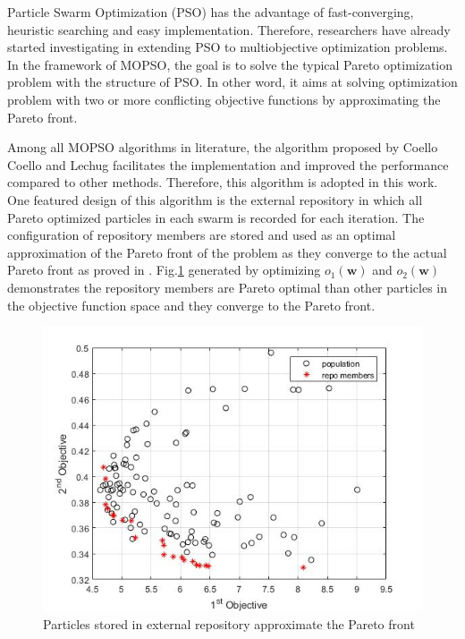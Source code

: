 Particle Swarm Optimization (PSO) has the advantage of fast-converging, heuristic searching and easy implementation\cite{coello2002mopso, alvarez2005mopso}. Therefore, researchers have already started investigating in extending PSO to multiobjective optimization problems. In the framework of MOPSO, the goal is to solve the typical Pareto optimization problem with the structure of PSO. In other word, it aims at solving optimization problem with two or more conflicting objective functions by approximating the Pareto front. 


Among all MOPSO algorithms in literature, the algorithm proposed by Coello Coello and Lechug facilitates the implementation and improved the performance compared to other methods\cite{coello2002mopso}. Therefore,  this algorithm is adopted in this work. One featured design of this algorithm is the external repository in which all Pareto optimized particles in each swarm is recorded for each iteration. The configuration of repository members are stored and used as an optimal approximation of the Pareto front of the problem as they converge to the actual Pareto front as proved in \cite{coello2002mopso}. Fig.\ref{fig:repo_members} generated by optimizing $o_1(\mathbf{w}) $ and $o_2(\mathbf{w})$ demonstrates the repository members are Pareto optimal than other particles in the objective function space and they converge to the Pareto front.

\begin{figure}[t]
\centering
\includegraphics[scale=.6]{Fig/repo_members.jpg}
\caption{Particles stored in external repository approximate the Pareto front}
\label{fig:repo_members}
\end{figure}

